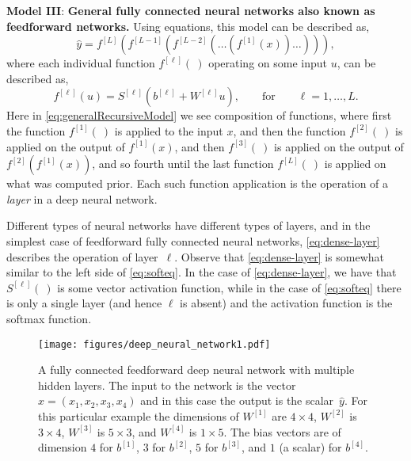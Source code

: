 \noindent
{\bf Model III}: {\bf General fully connected neural networks also known as feedforward networks.} Using equations, this model can be described as,
%
\begin{equation}
\label{eq:generalRecursiveModel}
\hat{y}=f^{[L]}(f^{[L-1]}(f^{[L-2]}(\ldots (f^{[1]}(x))\ldots))),
\end{equation}
%
where each individual function $f^{[\ell]}(~)$ operating on some input $u$, can be  described as,
%
\begin{equation}
\label{eq:dense-layer}
f^{[\ell]}(u) =
S^{[\ell]}(b^{[\ell]} + W^{[\ell]} u),
\qquad
\text{for}
\qquad
\ell = 1,\ldots,L.
\end{equation}
%
Here in \eqref{eq:generalRecursiveModel} we see composition of functions, where first the function $f^{[1]}(~)$ is applied to the input $x$, and then the function $f^{[2]}(~)$ is applied on the output of $f^{[1]}(x)$, and then $f^{[3]}(~)$ is applied on the output of $f^{[2]}(f^{[1]}(x))$, and so fourth until the last function $f^{[L]}(~)$ is applied on what was computed prior. Each such function application is the operation of a {\em layer} in a deep neural network. 

Different types of neural networks have different types of layers, and in the simplest case of feedforward fully connected neural networks, \eqref{eq:dense-layer} describes the operation of layer~$\ell$. Observe that \eqref{eq:dense-layer} is somewhat similar to the left side of \eqref{eq:softeq}. In the case of \eqref{eq:dense-layer}, we have that $S^{[\ell]}(~)$ is some vector activation function, while in the case of \eqref{eq:softeq} there is only a single layer (and hence $\ell$ is absent) and the activation function is the softmax function.  

\begin{figure}[h!] 
\begin{center}
\texttt{[image: figures/deep\_neural\_network1.pdf]}
 \caption{A fully connected feedforward deep neural network with multiple hidden layers. The input to the network is the vector $x = (x_1, x_2, x_3, x_4)$ and in this case the output is the scalar~$\hat{y}$. For this particular example the dimensions of $W^{[1]}$ are $4\times 4$, $W^{[2]}$ is $3 \times 4$, $W^{[3]}$ is $5 \times 3$, and $W^{[4]}$ is $1 \times 5$. The bias vectors are of dimension $4$ for $b^{[1]}$, $3$ for $b^{[2]}$, $5$ for $b^{[3]}$, and $1$ (a scalar) for $b^{[4]}$.
 }
    \label{FFNN}
\end{center}
\end{figure}

